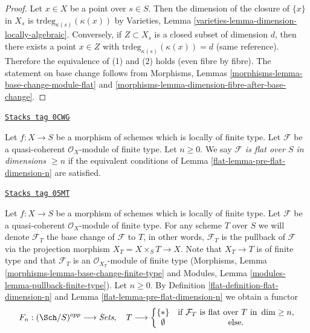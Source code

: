 \begin{proof}
Let $x \in X$ be a point over $s \in S$.
Then the dimension of the closure of $\{x\}$ in $X_s$
is $\text{trdeg}_{\kappa(s)}(\kappa(x))$ by
Varieties, Lemma \ref{varieties-lemma-dimension-locally-algebraic}.
Conversely, if $Z \subset X_s$ is a closed subset
of dimension $d$, then there exists a point $x \in Z$
with $\text{trdeg}_{\kappa(s)}(\kappa(x)) = d$ (same reference).
Therefore the equivalence of (1) and (2) holds (even fibre by fibre).
The statement on base change follows from
Morphisms, Lemmas \ref{morphisms-lemma-base-change-module-flat} and
\ref{morphisms-lemma-dimension-fibre-after-base-change}.
\end{proof}

\begin{definition}
\label{flat-definition-flat-dimension-n}
\href{https://stacks.math.columbia.edu/tag/0CWG}{\texttt{Stacks tag 0CWG}}

Let $f : X \to S$ be a morphism of schemes which is locally of finite type.
Let $\mathcal{F}$ be a quasi-coherent $\mathcal{O}_X$-module of finite type.
Let $n \geq 0$.
We say {\it $\mathcal{F}$ is flat over $S$ in dimensions $\geq n$}
if the equivalent conditions of Lemma \ref{flat-lemma-pre-flat-dimension-n}
are satisfied.
\end{definition}

\begin{definition}
\label{flat-situation-flat-dimension-n}
\href{https://stacks.math.columbia.edu/tag/05MT}{\texttt{Stacks tag 05MT}}

Let $f : X \to S$ be a morphism of schemes which is locally of finite type.
Let $\mathcal{F}$ be a quasi-coherent $\mathcal{O}_X$-module of finite
type. For any scheme $T$ over $S$ we will denote $\mathcal{F}_T$ the
base change of $\mathcal{F}$ to $T$, in other words, $\mathcal{F}_T$
is the pullback of $\mathcal{F}$ via the projection morphism
$X_T = X \times_S T \to X$. Note that $X_T \to T$ is of finite type
and that $\mathcal{F}_T$ is an $\mathcal{O}_{X_T}$-module
of finite type (Morphisms, Lemma
\ref{morphisms-lemma-base-change-finite-type} and
Modules, Lemma \ref{modules-lemma-pullback-finite-type}).
Let $n \geq 0$. By Definition \ref{flat-definition-flat-dimension-n} and
Lemma \ref{flat-lemma-pre-flat-dimension-n} we obtain a functor
\begin{equation}
\label{equation-flat-dimension-n}
F_n : (\Sch/S)^{opp} \longrightarrow \textit{Sets}, \quad
T \longrightarrow \left\{
\begin{matrix}
\{*\} & \text{if }\mathcal{F}_T\text{ is flat over }T\text{ in }\dim \geq n, \\
\emptyset & \text{else.}
\end{matrix}
\right.
\end{equation}
\end{definition}

